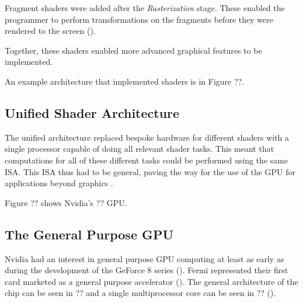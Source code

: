 Fragment shaders were added after the \textit{Rasterization} stage.
These enabled the programmer to perform transformations on the fragments
before they were rendered to the screen (\cite{lsu}).

Together, these shaders enabled more advanced graphical features to
be implemented.

An example architecture that implemented shaders is in Figure ??.

\subsection{Unified Shader Architecture}

The unified architecture replaced bespoke hardware for different shaders with
a single processor capable of doing all relevant shader tasks.
This meant that computations for all of these different tasks could be performed
using the same ISA. This ISA thus had to be general, paving the way for
the use of the GPU for applications beyond graphics \cite{parojModernUnification}.

Figure ?? shows Nvidia's ?? GPU.

\subsection{The General Purpose GPU}

Nvidia had an interest in general purpose GPU computing at least as early as during the development
of the GeForce 8 series (\cite{dally2021evolution}).
Fermi represented their first card marketed as a general purpose accelerator (\cite{nvidiafermi}).
The general architecture of the chip can be seen in ?? and a single 
multiprocessor core can be seen in ?? (\cite{nvidiafermi}).

